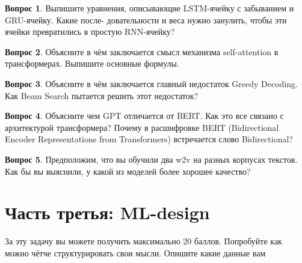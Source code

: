 \documentclass[12pt]{article}
\theoremstyle{definition}
\newtheorem{question}{Вопрос}
\begin{document}
\vspace{8cm} 

\begin{question}
    Выпишите уравнения, описывающие LSTM-ячейку с забыванием и GRU-ячейку. Какие после- довательности и веса нужно занулить, чтобы эти ячейки превратились в простую RNN-ячейку?
\end{question}

\newpage

 
\begin{question}
Объясните в чём заключается смысл механизма self-attention в трансформерах. Выпишите основные формулы. 
\end{question}

\vspace{8cm} 

\begin{question}
Объясните в чём заключается главный недостаток Greedy Decoding. Как Beam Search пытается решить этот недостаток? 
\end{question}

\newpage

\begin{question}
Объясните чем GPT отличается от BERT. Как это все связано с архитектурой трансформера? Почему в расшифровке BERT (Bidirectional Encoder Representations from Transformers) встречается слово Bidirectional? 
\end{question}

\vspace{8cm} 


\begin{question}
Предположим, что вы обучили два w2v на разных корпусах текстов. Как бы вы выяснили, у какой из моделей более хорошее качество? 
\end{question}



\newpage 

\section*{Часть третья: ML-design}

За эту задачу вы можете получить максимально 20 баллов. Попробуйте как можно чётче структурировать свои мысли. Опишите какие данные вам 
\end{document}
